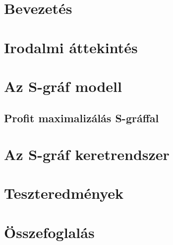 \documentclass [12pt]{report}
\begin{document}

\setcounter{page}{1}
\tableofcontents

\chapter{Bevezetés}
\setcounter{page}{1}
\chapter{Irodalmi áttekintés}
\chapter{Az S-gráf modell}
\section{Profit maximalizálás S-gráffal}



\chapter{Az S-gráf keretrendszer} \label{s-graph_framework}



\chapter{Teszteredmények}
\chapter{Összefoglalás}



\end{document}
